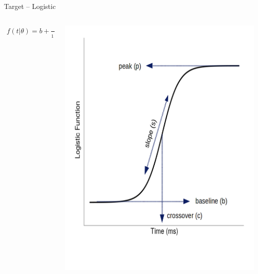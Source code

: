 \documentclass{beamer}
\begin{document}
\begin{frame}{Target -- Logistic}

\vspace{-5mm}

\begin{columns}
\begin{column}{0.45\textwidth}

\begin{align*}
f(t | \theta) = b + \frac{p-b}{1 + \exp \left( \frac{4s}{p-b} (c - t) \right)}
\end{align*}
\end{column}
\begin{column}{0.5\textwidth}  %
\begin{center}
\includegraphics[scale=0.3]{img/logistic_label.png}
\end{center}
\end{column}
\end{columns}
\end{frame}
%
\end{document}

